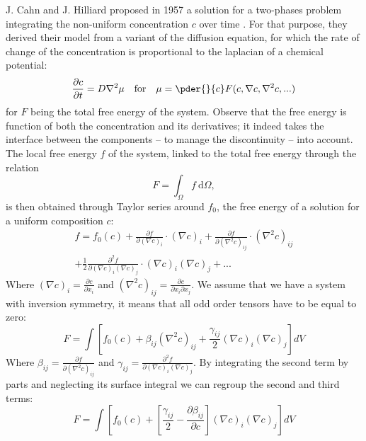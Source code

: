 \documentclass[10pt,a4paper,twocolumn]{article}
\begin{document}
J. Cahn and J. Hilliard proposed in 1957 a solution for a two-phases problem integrating the non-uniform concentration $c$ over time \cite{cahn_hilliard}. For that purpose, they derived their model from a variant of the diffusion equation, for which the rate of change of the concentration is proportional to the laplacian of a chemical potential:
\begin{equation}
    \frac{\partial c}{\partial t} = D{\nabla^2} \mu \quad\text{for}\quad \mu = \pder{}{c}F(c,\nabla c, \nabla^2 c, ...)
    \label{eq:diffusion}
\end{equation}
for $F$ being the total free energy of the system.
Observe that the free energy is function of both the concentration and its derivatives; it indeed takes the interface between the components -- to manage the discontinuity -- into account. The local free energy $f$ of the system, linked to the total free energy through the relation
\begin{equation}
	F = \int_\Omega f\ \mathrm{d}\Omega,
\end{equation}
is then obtained through Taylor series around $f_0$, the free energy of a solution for a uniform composition $c$:
\begin{multline}
    f = f_0(c) + \frac{\partial f}{\partial (\nabla c)_i} \cdot (\nabla c)_i + \frac{\partial f}{\partial (\nabla^2 c)_{ij}} \cdot (\nabla^2 c)_{ij} \\+ \frac{1}{2} \frac{\partial^2 f}{\partial (\nabla c)_i(\nabla c)_j} \cdot (\nabla c)_i(\nabla c)_j + ...
\end{multline}
Where $(\nabla c)_i = \frac{\partial c}{\partial x_i}$ and $(\nabla^2 c)_{ij} = \frac{\partial c}{\partial x_i\partial x_j}$.
We assume that we have a system with inversion symmetry, it means that all odd order tensors have to be equal to zero:
\begin{equation}
    F = \int [ f_0(c) + \beta_{ij}(\nabla^2 c)_{ij} + \frac{\gamma_{ij}}{2} (\nabla c)_i(\nabla c)_j] dV
\end{equation}
Where $ \beta_{ij} = \frac{\partial f}{\partial (\nabla^2 c)_{ij}} $ and $\gamma_{ij} = \frac{\partial^2 f}{\partial (\nabla c)_i(\nabla c)_j} $.
By integrating the second term by parts and neglecting its surface integral we can regroup the second and third terms:
\begin{equation}
    F = \int  [f_0(c) + [\frac{\gamma_{ij}}{2} - \frac{\partial \beta_{ij}}{\partial c}](\nabla c)_i(\nabla c)_j]dV
\end{equation}
\end{document}
